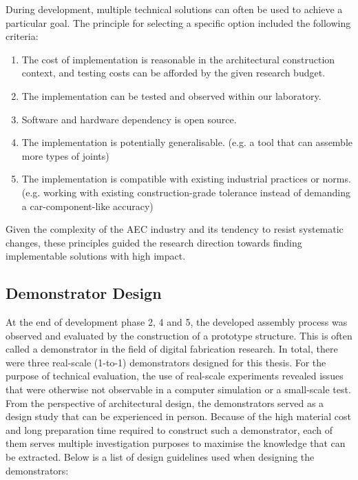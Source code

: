 During development, multiple technical solutions can often be used to achieve a particular goal. The principle for selecting a specific option included the following criteria: 

\begin{enumerate}
	\item The cost of implementation is reasonable in the architectural construction context, and testing costs can be afforded by the given research budget.

	\item The implementation can be tested and observed within our laboratory.

	\item Software and hardware dependency is open source.

	\item The implementation is potentially generalisable. (e.g. a tool that can assemble more types of joints)

	\item The implementation is compatible with existing industrial practices or norms. (e.g. working with existing construction-grade tolerance instead of demanding a car-component-like accuracy) 

\end{enumerate}
Given the complexity of the AEC industry and its tendency to resist systematic changes, these principles guided the research direction towards finding implementable solutions with high impact.

\subsection{Demonstrator Design}
\label{subsection:methodology-demonstraror-design}

At the end of development phase 2, 4 and 5, the developed assembly process was observed and evaluated by the construction of a prototype structure. This is often called a demonstrator in the field of digital fabrication research. In total, there were three real-scale (1-to-1) demonstrators designed for this thesis. For the purpose of technical evaluation, the use of real-scale experiments revealed issues that were otherwise not observable in a computer simulation or a small-scale test. From the perspective of architectural design, the demonstrators served as a design study that can be experienced in person. Because of the high material cost and long preparation time required to construct such a demonstrator, each of them serves multiple investigation purposes to maximise the knowledge that can be extracted. Below is a list of design guidelines used when designing the demonstrators:

